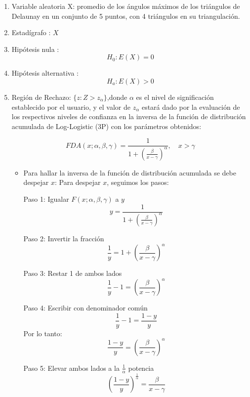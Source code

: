 \documentclass[12pt]{report}
\begin{document}
\begin{enumerate}
	\item Variable aleatoria X: promedio de los ángulos máximos de los triángulos de Delaunay en un conjunto de 5 puntos, con 4 triángulos en su triangulación.
	\item Estadígrafo : $X$
	
	\item Hipótesis nula : \[H_0:E(X)=0\]
	
	
	\item Hipótesis alternativa : \[H_a:E(X)>0\]
	
	\item  Región de Rechazo: $\{z:Z>z_\alpha\}$,donde $\alpha$ es el nivel de significación establecido por el usuario, y el valor de $z_\alpha$ estará dado por la evaluación de los respectivos niveles de confianza en la  inversa de la función de distribución acumulada de Log-Logistic (3P) con los parámetros obtenidos: 
	
	\[
	FDA(x; \alpha, \beta, \gamma) = \frac{1}{1 + \left( \frac{\beta}{x - \gamma} \right)^\alpha}, \quad x > \gamma
	\]
	\begin{itemize}
		\item  Para hallar la inversa de la función de distribución acumulada se debe despejar $x$:
		Para despejar \( x \), seguimos los pasos:
		
		Paso 1: Igualar \( F(x; \alpha, \beta, \gamma) \) a \( y \)
		\[
		y = \frac{1}{1 + \left( \frac{\beta}{x - \gamma} \right)^\alpha}
		\]
		
		Paso 2: Invertir la fracción
		\[
		\frac{1}{y} = 1 + \left( \frac{\beta}{x - \gamma} \right)^\alpha
		\]
		
		Paso 3: Restar 1 de ambos lados
		\[
		\frac{1}{y} - 1 = \left( \frac{\beta}{x - \gamma} \right)^\alpha
		\]
		
		Paso 4: Escribir con denominador común
		\[
		\frac{1}{y} - 1 = \frac{1 - y}{y}
		\]
		Por lo tanto:
		\[
		\frac{1 - y}{y} = \left( \frac{\beta}{x - \gamma} \right)^\alpha
		\]
		
		Paso 5: Elevar ambos lados a la \( \frac{1}{\alpha} \) potencia
		\[
		\left( \frac{1 - y}{y} \right)^{\frac{1}{\alpha}} = \frac{\beta}{x - \gamma}
		\]
		

\end{itemize}
\end{enumerate}
\end{document}
